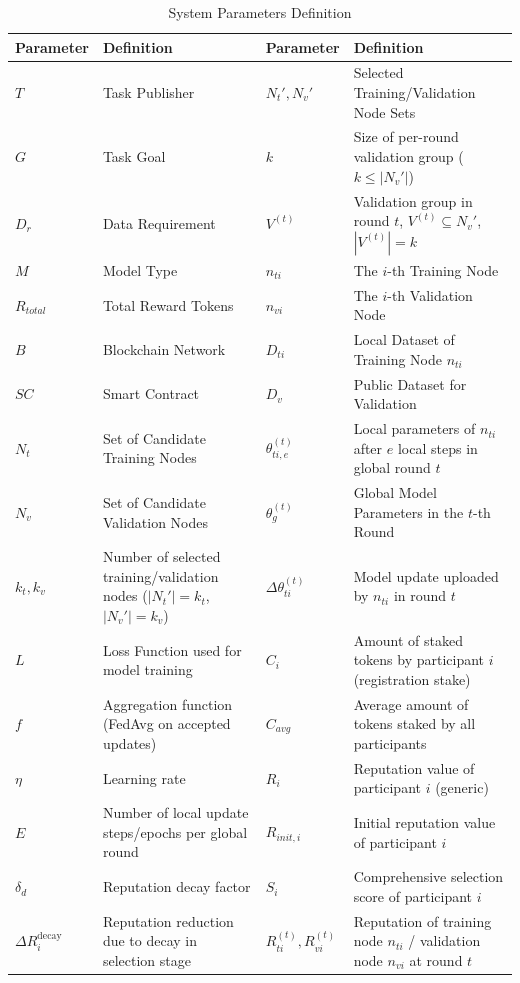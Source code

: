 \documentclass[a4paper]{cas-dc}
\begin{document}
\begin{table}[htbp]
	\centering
	\caption{System Parameters Definition} \label{table1}
	\renewcommand{\arraystretch}{1.1}    
	\begin{tabular}{p{} p{}| p{} p{}}
		\toprule
		\textbf{Parameter} & \textbf{Definition} & \textbf{Parameter} & \textbf{Definition} \\
		\midrule
		$T$ & Task Publisher & $N_t',N_v'$ & Selected Training/Validation Node Sets \\
		$G$ & Task Goal & $k$ & Size of per-round validation group ($k \le |N_v'|$) \\
		$D_r$ & Data Requirement & $V^{(t)}$ & Validation group in round $t$, $V^{(t)} \subseteq N_v'$, $|V^{(t)}|=k$ \\
		$M$ & Model Type & $n_{ti}$ & The $i$-th Training Node \\
		$R_{total}$ & Total Reward Tokens & $n_{vi}$ & The $i$-th Validation Node \\
		$B$ & Blockchain Network & $D_{ti}$ & Local Dataset of Training Node $n_{ti}$ \\
		$SC$ & Smart Contract & $D_v$ & Public Dataset for Validation \\
		$N_t$ & Set of Candidate Training Nodes & $\theta_{ti,e}^{(t)}$ & Local parameters of $n_{ti}$ after $e$ local steps in global round $t$ \\
		$N_v$ & Set of Candidate Validation Nodes & $\theta_g^{(t)}$ & Global Model Parameters in the $t$-th Round \\
		$k_t, k_v$ & Number of selected training/validation nodes ($|N_t'|=k_t$, $|N_v'|=k_v$) & $\Delta\theta_{ti}^{(t)}$ & Model update uploaded by $n_{ti}$ in round $t$ \\
		$L$ & Loss Function used for model training & $C_i$ & Amount of staked tokens by participant $i$ (registration stake) \\
		$f$ & Aggregation function (FedAvg on accepted updates) & $C_{avg}$ & Average amount of tokens staked by all participants \\
		$\eta$ & Learning rate & $R_i$ & Reputation value of participant $i$ (generic) \\
		$E$ & Number of local update steps/epochs per global round & $R_{init,i}$ & Initial reputation value of participant $i$ \\
		$\delta_d$ & Reputation decay factor & $S_i$ & Comprehensive selection score of participant $i$ \\
		$\Delta R_i^{\mathrm{decay}}$ & Reputation reduction due to decay in selection stage & $R_{ti}^{(t)},R_{vi}^{(t)}$ & Reputation of training node $n_{ti}$ / validation node $n_{vi}$ at round $t$ \\

\end{tabular}
\end{table}
\end{document}
